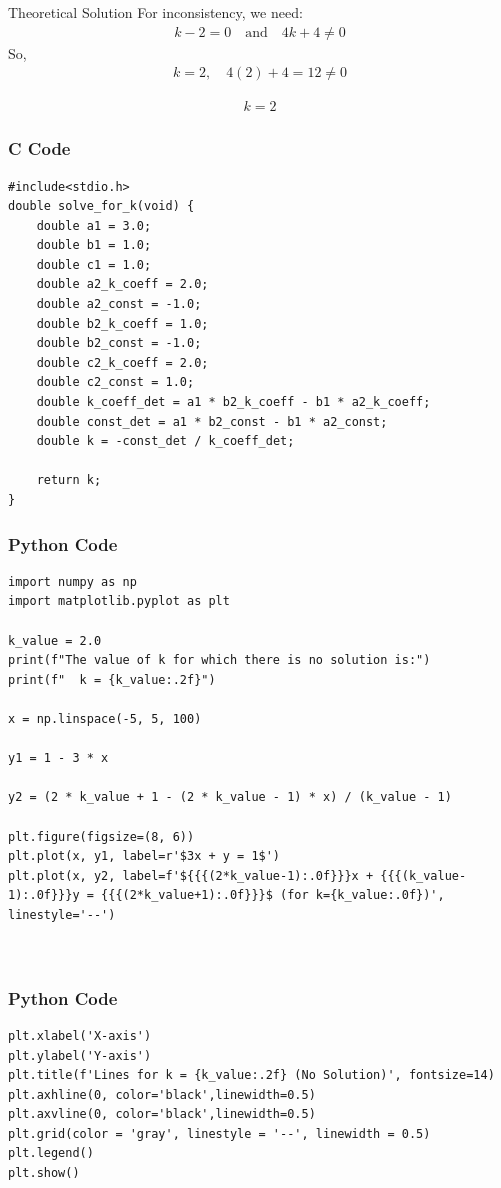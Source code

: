 \documentclass{beamer}
\begin{document}
\begin{frame}{Theoretical Solution}
For inconsistency, we need:
\begin{align}
k-2 = 0 \quad \text{and} \quad 4k+4 \neq 0
\end{align}
So,
\begin{align}
k = 2, \quad 4(2)+4 = 12 \neq 0
\end{align}

\begin{align*}
\boxed{k = 2}
\end{align*}
\end{frame}

\begin{frame}[fragile]
    \frametitle{C Code}

    \begin{lstlisting}
#include<stdio.h>
double solve_for_k(void) {
    double a1 = 3.0;
    double b1 = 1.0;
    double c1 = 1.0;
    double a2_k_coeff = 2.0;
    double a2_const = -1.0;
    double b2_k_coeff = 1.0;
    double b2_const = -1.0;
    double c2_k_coeff = 2.0;
    double c2_const = 1.0;
    double k_coeff_det = a1 * b2_k_coeff - b1 * a2_k_coeff;
    double const_det = a1 * b2_const - b1 * a2_const;
    double k = -const_det / k_coeff_det;

    return k;
}

    \end{lstlisting}
\end{frame}


\begin{frame}[fragile]
    \frametitle{Python Code}
    \begin{lstlisting}
import numpy as np
import matplotlib.pyplot as plt

k_value = 2.0
print(f"The value of k for which there is no solution is:")
print(f"  k = {k_value:.2f}")

x = np.linspace(-5, 5, 100)

y1 = 1 - 3 * x

y2 = (2 * k_value + 1 - (2 * k_value - 1) * x) / (k_value - 1)

plt.figure(figsize=(8, 6))
plt.plot(x, y1, label=r'$3x + y = 1$')
plt.plot(x, y2, label=f'${{{(2*k_value-1):.0f}}}x + {{{(k_value-1):.0f}}}y = {{{(2*k_value+1):.0f}}}$ (for k={k_value:.0f})', linestyle='--')



    \end{lstlisting}
\end{frame}

\begin{frame}[fragile]
    \frametitle{Python Code}
    \begin{lstlisting}
plt.xlabel('X-axis')
plt.ylabel('Y-axis')
plt.title(f'Lines for k = {k_value:.2f} (No Solution)', fontsize=14)
plt.axhline(0, color='black',linewidth=0.5)
plt.axvline(0, color='black',linewidth=0.5)
plt.grid(color = 'gray', linestyle = '--', linewidth = 0.5)
plt.legend()
plt.show()
   
    \end{lstlisting}
\end{frame}
\end{document}
